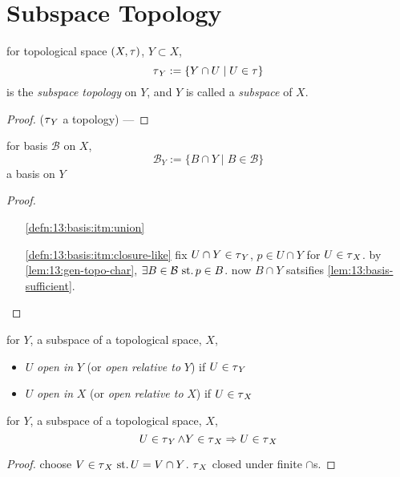\section{Subspace Topology}

\begin{defn}
  for topological space $(X,\operatorname{\tau})$, $Y\subset X$,
  \[ \operatorname{\tau}_Y := \{Y\cap U\mid U\in\operatorname{\tau}\} \]
  is the \emph{subspace topology} on $Y$,
  and $Y$ is called a \emph{subspace} of $X$.
\end{defn}
\begin{proof}($\operatorname{\tau}_Y$ a topology) ---
\end{proof}

\begin{lem}\label{lem:16.1}\label{lem:16:subspc-basis}
  for basis $\mathcal B$ on $X$,
  \[ \mathcal B_Y := \{B\cap Y\mid B\in\mathcal B\} \]
  a basis on $Y$
\end{lem}
\begin{proof}
  \begin{itemize}
  \item[\ref{defn:13:basis:itm:union}]
  \item[\ref{defn:13:basis:itm:closure-like}]
    fix $U\cap Y\in\operatorname{\tau}_Y$, $p\in U\cap Y$ for $U\in\operatorname{\tau}_X$.
    by \ref{lem:13:gen-topo-char},
    $\exists B\in\mathcal B\operatorname{\,st.} p\in B$.
    now $B\cap Y$ satsifies \ref{lem:13:basis-sufficient}.
  \end{itemize}
\end{proof}

\begin{defn}
  for $Y$, a subspace of a topological space, $X$,
  \begin{itemize}
  \item
    $U$ \emph{open in} $Y$ (or \emph{open relative to} $Y$)
    if $U\in\operatorname{\tau}_Y$
  \item
    $U$ \emph{open in} $X$ (or \emph{open relative to} $X$)
    if $U\in\operatorname{\tau}_X$
  \end{itemize}
\end{defn}

\begin{lem}\label{lem:16.2}\label{lem:16:open-rel-open}
  for $Y$, a subspace of a topological space, $X$,
  \[
  U\in\operatorname{\tau}_Y\land Y\in\operatorname{\tau}_X\Rightarrow U\in\operatorname{\tau}_X
  \]
\end{lem}
\begin{proof}
  choose $V\in\operatorname{\tau}_X\operatorname{\,st.} U=V\cap Y$.
  $\operatorname{\tau}_X$ closed under finite $\cap$s.
\end{proof}

